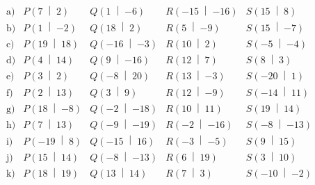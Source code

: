 \begin{equation*}
  \begin{array}{lllll}
    \text{a)} & P\left(\num{7}\;\middle|\;\num{2}\right) & Q\left(\num{1}\;\middle|\;\num{-6}\right) & R\left(\num{-15}\;\middle|\;\num{-16}\right) & S\left(\num{15}\;\middle|\;\num{8}\right) \\[1ex]
    \text{b)} & P\left(\num{1}\;\middle|\;\num{-2}\right) & Q\left(\num{18}\;\middle|\;\num{2}\right) & R\left(\num{5}\;\middle|\;\num{-9}\right) & S\left(\num{15}\;\middle|\;\num{-7}\right) \\[1ex]
    \text{c)} & P\left(\num{19}\;\middle|\;\num{18}\right) & Q\left(\num{-16}\;\middle|\;\num{-3}\right) & R\left(\num{10}\;\middle|\;\num{2}\right) & S\left(\num{-5}\;\middle|\;\num{-4}\right) \\[1ex]
    \text{d)} & P\left(\num{4}\;\middle|\;\num{14}\right) & Q\left(\num{9}\;\middle|\;\num{-16}\right) & R\left(\num{12}\;\middle|\;\num{7}\right) & S\left(\num{8}\;\middle|\;\num{3}\right) \\[1ex]
    \text{e)} & P\left(\num{3}\;\middle|\;\num{2}\right) & Q\left(\num{-8}\;\middle|\;\num{20}\right) & R\left(\num{13}\;\middle|\;\num{-3}\right) & S\left(\num{-20}\;\middle|\;\num{1}\right) \\[1ex]
    \text{f)} & P\left(\num{2}\;\middle|\;\num{13}\right) & Q\left(\num{3}\;\middle|\;\num{9}\right) & R\left(\num{12}\;\middle|\;\num{-9}\right) & S\left(\num{-14}\;\middle|\;\num{11}\right) \\[1ex]
    \text{g)} & P\left(\num{18}\;\middle|\;\num{-8}\right) & Q\left(\num{-2}\;\middle|\;\num{-18}\right) & R\left(\num{10}\;\middle|\;\num{11}\right) & S\left(\num{19}\;\middle|\;\num{14}\right) \\[1ex]
    \text{h)} & P\left(\num{7}\;\middle|\;\num{13}\right) & Q\left(\num{-9}\;\middle|\;\num{-19}\right) & R\left(\num{-2}\;\middle|\;\num{-16}\right) & S\left(\num{-8}\;\middle|\;\num{-13}\right) \\[1ex]
    \text{i)} & P\left(\num{-19}\;\middle|\;\num{8}\right) & Q\left(\num{-15}\;\middle|\;\num{16}\right) & R\left(\num{-3}\;\middle|\;\num{-5}\right) & S\left(\num{9}\;\middle|\;\num{15}\right) \\[1ex]
    \text{j)} & P\left(\num{15}\;\middle|\;\num{14}\right) & Q\left(\num{-8}\;\middle|\;\num{-13}\right) & R\left(\num{6}\;\middle|\;\num{19}\right) & S\left(\num{3}\;\middle|\;\num{10}\right) \\[1ex]
    \text{k)} & P\left(\num{18}\;\middle|\;\num{19}\right) & Q\left(\num{13}\;\middle|\;\num{14}\right) & R\left(\num{7}\;\middle|\;\num{3}\right) & S\left(\num{-10}\;\middle|\;\num{-2}\right) \\[1ex]

\end{array}
\end{equation*}

